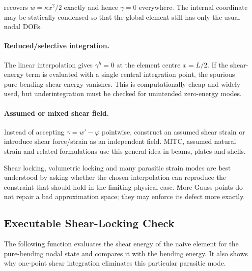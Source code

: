 recovers $w=\kappa x^2/2$ exactly and hence $\gamma=0$ everywhere. The internal
coordinate may be statically condensed so that the global element still has
only the usual nodal DOFs.

\paragraph{Reduced/selective integration.}
The linear interpolation gives $\gamma^h=0$ at the element centre $x=L/2$. If
the shear-energy term is evaluated with a single central integration point, the
spurious pure-bending shear energy vanishes. This is computationally cheap and
widely used, but underintegration must be checked for unintended zero-energy
modes.

\paragraph{Assumed or mixed shear field.}
Instead of accepting $\gamma=w'-\varphi$ pointwise, construct an assumed shear
strain or introduce shear force/strain as an independent field. MITC, assumed
natural strain and related formulations use this general idea in beams, plates
and shells.

\begin{notebooknote}

Shear locking, volumetric locking and many parasitic strain modes are best
understood by asking whether the chosen interpolation can reproduce the
constraint that should hold in the limiting physical case. More Gauss points do
not repair a bad approximation space; they may enforce its defect more exactly.
\end{notebooknote}

\subsection{Executable Shear-Locking Check}

The following function evaluates the shear energy of the naive element for the
pure-bending nodal state and compares it with the bending energy. It also shows
why one-point shear integration eliminates this particular parasitic mode.

